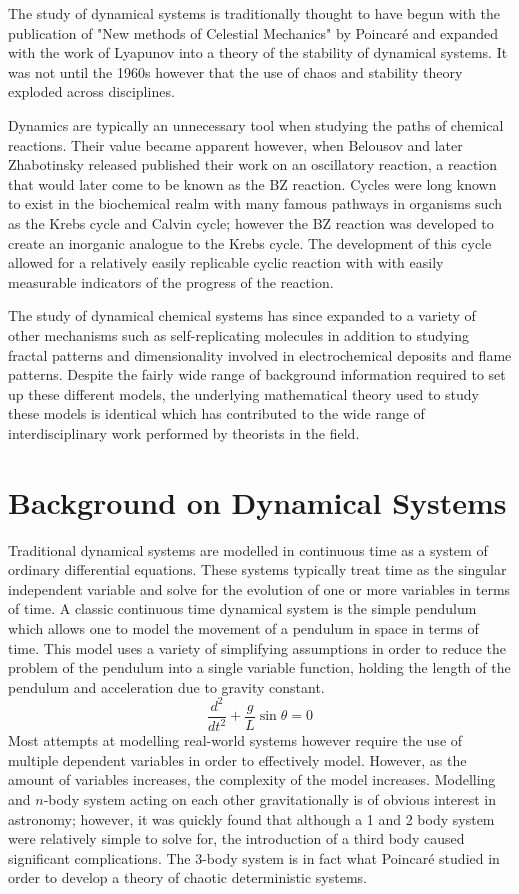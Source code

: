 The study of dynamical systems is traditionally thought to have begun with the publication of "New methods of Celestial Mechanics" by Poincar\'e and expanded with the work of Lyapunov into a theory of the stability of dynamical systems. It was not until the 1960s however that the use of chaos and stability theory exploded across disciplines\autocite{Aubin2002}. 

Dynamics are typically an unnecessary tool when studying the paths of chemical reactions. Their value became apparent however, when Belousov and later Zhabotinsky released published their work on an oscillatory reaction, a reaction that would later come to be known as the BZ reaction\autocite{Winfree1984}. Cycles were long known to exist in the biochemical realm with many famous pathways in organisms such as the Krebs cycle and Calvin cycle; however the BZ reaction was developed to create an inorganic analogue to the Krebs cycle. The development of this cycle allowed for a relatively easily replicable cyclic reaction with with easily measurable indicators of the progress of the reaction. 

The study of dynamical chemical systems has since expanded to a variety of other mechanisms such as self-replicating molecules in addition to studying fractal patterns and dimensionality involved in electrochemical deposits and flame patterns. Despite the fairly wide range of background information required to set up these different models, the underlying mathematical theory used to study these models is identical which has contributed to the wide range of interdisciplinary work performed by theorists in the field.
\section{Background on Dynamical Systems}
Traditional dynamical systems are modelled in continuous time as a system of ordinary differential equations. These systems typically treat time as the singular independent variable and solve for the evolution of one or more variables in terms of time. A classic continuous time dynamical system is the simple pendulum which allows one to model the movement of a pendulum in space in terms of time. This model uses a variety of simplifying assumptions in order to reduce the problem of the pendulum into a single variable function, holding the length of the pendulum and acceleration due to gravity constant.
\begin{equation}
    \frac{d^2}{dt^2}+\frac{g}{L}\sin\theta=0
\end{equation}
Most  attempts  at  modelling  real-world  systems  however  require  the  use  of  multiple dependent variables in order to effectively model.  However, as the amount of variables increases, the complexity of the model increases.  Modelling and $n$-body system acting on each other gravitationally is of obvious interest in astronomy; however, it was quickly found  that  although  a  1  and  2  body  system  were  relatively  simple  to  solve  for,  the introduction of a third body caused significant complications.  The 3-body system is in fact what Poincar\'e studied in order to develop a theory of chaotic deterministic systems\autocite{Poincare1993}.

